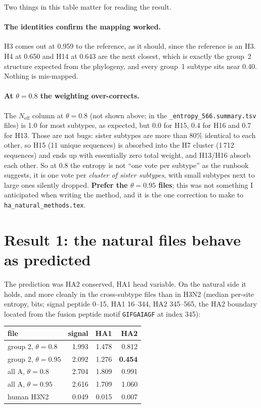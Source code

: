 \documentclass[11pt,a4paper]{article}
\newcommand{\file}[1]{\texttt{#1}}
\newcommand{\Neff}{N_{\mathrm{eff}}}
\begin{document}
Two things in this table matter for reading the result.

\paragraph{The identities confirm the mapping worked.}
H3 comes out at 0.959 to the reference, as it should, since the reference is an
H3. H4 at 0.650 and H14 at 0.643 are the next closest, which is exactly the
group~2 structure expected from the phylogeny, and every group~1 subtype sits
near 0.40. Nothing is mis-mapped.

\paragraph{At $\theta = 0.8$ the weighting over-corrects.}
The $\Neff$ column at $\theta = 0.8$ (not shown above; in the
\file{\_entropy\_566.summary.tsv} files) is 1.0 for most subtypes, as expected,
but 0.0 for H15, 0.4 for H16 and 0.7 for H13. Those are not bugs: sister
subtypes are more than 80\% identical to each other, so H15 (11 unique
sequences) is absorbed into the H7 cluster (1\,712 sequences) and ends up with
essentially zero total weight, and H13/H16 absorb each other. So at 0.8 the
entropy is not ``one vote per subtype'' as the runbook suggests, it is one vote
per \emph{cluster of sister subtypes}, with small subtypes next to large ones
silently dropped. \textbf{Prefer the $\theta = 0.95$ files}; this was not
something I anticipated when writing the method, and it is the one correction to
make to \file{ha\_natural\_methods.tex}.

\section{Result 1: the natural files behave as predicted}

The prediction was HA2 conserved, HA1 head variable. On the natural side it
holds, and more cleanly in the cross-subtype files than in H3N2 (median per-site
entropy, bits; signal peptide 0--15, HA1 16--344, HA2 345--565, the HA2 boundary
located from the fusion peptide motif \texttt{GIFGAIAGF} at index 345):

\begin{center}
\begin{tabular}{@{}lrrr@{}}
\toprule
file & signal & HA1 & HA2 \\
\midrule
group 2, $\theta = 0.8$  & 1.993 & 1.478 & 0.812 \\
group 2, $\theta = 0.95$ & 2.092 & 1.276 & \textbf{0.454} \\
all A, $\theta = 0.8$    & 2.704 & 1.809 & 0.991 \\
all A, $\theta = 0.95$   & 2.616 & 1.709 & 1.060 \\
human H3N2               & 0.049 & 0.015 & 0.007 \\
\bottomrule
\end{tabular}
\end{center}
\end{document}

